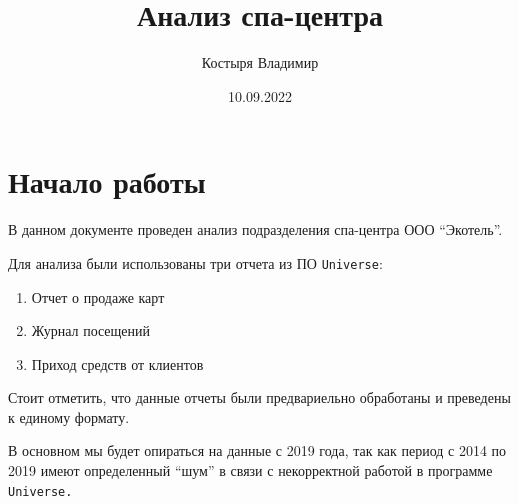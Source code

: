 \documentclass[
  letterpaper,
  DIV=11,
  numbers=noendperiod]{scrreprt}
\title{Анализ спа-центра}
\author{Костыря Владимир}
\date{10.09.2022}
\providecommand{\tightlist}{%
  \setlength{\itemsep}{0pt}\setlength{\parskip}{0pt}}\usepackage{longtable,booktabs,array}
\renewcommand*\contentsname{Table of contents}
\newcommand\contentsname{Table of contents}
\begin{document}
\maketitle
\ifdefined\Shaded\renewenvironment{Shaded}{\begin{tcolorbox}[interior hidden, frame hidden, breakable, enhanced, borderline west={3pt}{0pt}{shadecolor}, sharp corners, boxrule=0pt]}{\end{tcolorbox}}\fi

\renewcommand*\contentsname{Table of contents}
{
\hypersetup{linkcolor=}
\setcounter{tocdepth}{2}
\tableofcontents
}

\hypertarget{ux43dux430ux447ux430ux43bux43e-ux440ux430ux431ux43eux442ux44b}{%
\chapter*{Начало
работы}\label{ux43dux430ux447ux430ux43bux43e-ux440ux430ux431ux43eux442ux44b}}

В данном документе проведен анализ подразделения спа-центра ООО
``Экотель''.

Для анализа были использованы три отчета из ПО \texttt{Universe}:

\begin{enumerate}
\def\labelenumi{\arabic{enumi}.}
\tightlist
\item
  Отчет о продаже карт
\item
  Журнал посещений
\item
  Приход средств от клиентов
\end{enumerate}

Стоит отметить, что данные отчеты были предвариельно обработаны и
преведены к единому формату.

\begin{tcolorbox}[enhanced jigsaw, breakable, arc=.35mm, colback=white, left=2mm, colframe=quarto-callout-important-color-frame, toprule=.15mm, bottomrule=.15mm, leftrule=.75mm, opacityback=0, rightrule=.15mm]
\begin{minipage}[t]{5.5mm}
\textcolor{quarto-callout-important-color}{\faExclamation}
\end{minipage}%
\begin{minipage}[t]{\textwidth - 5.5mm}
В основном мы будет опираться на данные с 2019 года, так как период с
2014 по 2019 имеют определенный ``шум'' в связи с некорректной работой в
программе \texttt{Universe.}\end{minipage}%
\end{tcolorbox}
\end{document}
